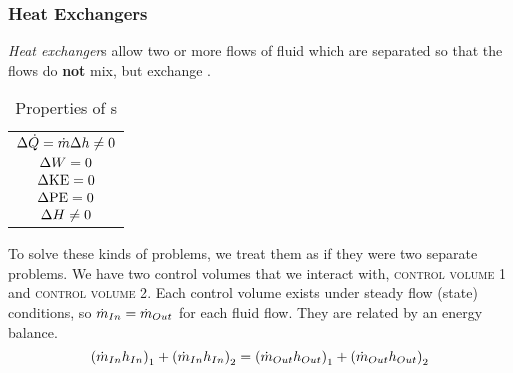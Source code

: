\subsubsection{Heat Exchangers}\label{subsubsec:Heat_Exchangers}
\begin{definition}\label{def:Heat_Exchanger}
  \emph{Heat exchanger}s allow two or more flows of fluid which are separated so that the flows do \textbf{not} mix, but exchange .
\end{definition}

\begin{table}[h!tbp]
  \centering
  \begin{tabular}{c}
    \toprule
    \nameref{def:Heat_Exchanger} \\
    \midrule
    $\Delta \dot{Q} = \dot{m} \Delta h \neq 0$ \\
    $\Delta W = 0 $ \\
    $\Delta \mathrm{KE} = 0$ \\
    $\Delta \mathrm{PE} = 0$ \\
    $\Delta H \neq 0$ \\
    \bottomrule
  \end{tabular}
  \caption{Properties of s}
  \label{tab:Heat_Exchanger_Properties}
\end{table}

To solve these kinds of problems, we treat them as if they were two separate problems.
We have two control volumes that we interact with, \textsc{control volume 1} and \textsc{control volume 2}.
Each control volume exists under steady flow (state) conditions, so $\dot{m}_{In} = \dot{m}_{Out}$ for each fluid flow.
They are related by an energy balance.
\begin{equation}\label{eq:Heat_Exchanger_Energy_Balance}
  {(\ensuremath{\dot{m}}_{In} \ensuremath{h}_{In})}_{1} + {(\dot{m}_{In} h_{In})}_{2} = {(\dot{m}_{Out} h_{Out})}_{1} + {(\dot{m}_{Out} h_{Out})}_{2}
\end{equation}

